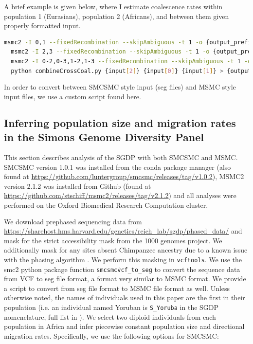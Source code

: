 A brief example is given below, where I estimate coalescence rates within population 1 (Eurasians), population 2 (Africans), and between them given properly formatted input. 

\begin{lstlisting}[language=Bash]
  msmc2 -I 0,1 --fixedRecombination --skipAmbiguous -t 1 -o {output_prefix} {input_string}
  msmc2 -I 2,3 --fixedRecombination --skipAmbiguous -t 1 -o {output_prefix} {input_string}
  msmc2 -I 0-2,0-3,1-2,1-3 --fixedRecombination --skipAmbiguous -t 1 -o {output_prefix} {input_string}
  python combineCrossCoal.py {input[2]} {input[0]} {input[1]} > {output[0]}
\end{lstlisting}

In order to convert between SMCSMC style input (seg files) and MSMC style input files, we use a custom script found \href{https://github.com/Chris1221/ancient_african_admixture/blob/master/pipelines/real_data/py/smc2-to-msmc.py}{here}.

\subsection{Inferring population size and migration rates in the Simons Genome Diversity Panel}

This section describes analysis of the SGDP with both SMCSMC and MSMC. SMCSMC version 1.0.1 was installed from the conda package manager (also found at \url{https://github.com/luntergroup/smcsmc/releases/tag/v1.0.2}), MSMC2 version 2.1.2 was installed from Github (found at \url{https://github.com/stschiff/msmc2/releases/tag/v2.1.2}) and all analyses were performed on the Oxford Biomedical Research Computation cluster. 

We download prephased sequencing data from \url{https://sharehost.hms.harvard.edu/genetics/reich_lab/sgdp/phased_data/} and mask for the strict accessibility mask from the 1000 genomes project. 
We additionally mask for any sites absent Chimpanzee ancestry due to a known issue with the phasing algorithm \cite{Wang2019a}. 
We perform this masking in {\tt vcftools}. We use the \gls{smc2} python package function {\tt smcsmc\.vcf\_to\_seg} to convert the sequence data from VCF to seg file format, a format very similar to MSMC format. 
We provide a script to convert from seg file format to MSMC file format as well. 
Unless otherwise noted, the names of individuals used in this paper are the first in their population (i.e. an individual named Yoruban is {\tt S\_Yoruba} in the SGDP nomenclature, full list in ).  
We select two diploid individuals from each population in Africa  and infer piecewise constant population size and directional migration rates. Specifically, we use the following options for SMCSMC:

